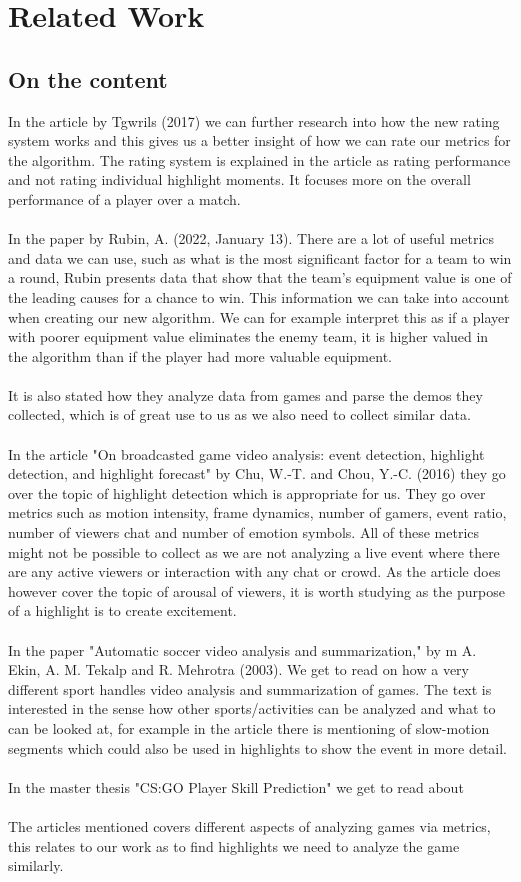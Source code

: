 \chapter{Related Work}
\label{chp:relatedwork}
\section{On the content}

In the article \cite{Tgwri1s2017} by Tgwrils (2017) we can further research into how the new rating system works and this gives us a better insight of how we can rate our metrics for the algorithm. The rating system is explained in the article as rating performance and not rating individual highlight moments. It focuses more on the overall performance of a player over a match. 
\\\\
In the paper \cite{Rubin2022} by Rubin, A. (2022, January 13). There are a lot of useful metrics and data we can use, such as what is the most significant factor for a team to win a round, Rubin presents data that show that the team's equipment value is one of the leading causes for a chance to win. This information we can take into account when creating our new algorithm. We can for example interpret this as if a player with poorer equipment value eliminates the enemy team, it is higher valued in the algorithm than if the player had more valuable equipment.\\\\ 
It is also stated how they analyze data from games and parse the demos they collected, which is of great use to us as we also need to collect similar data.\\\\
In the article "On broadcasted game video analysis: event detection, highlight detection, and highlight forecast" by Chu, W.-T. and Chou, Y.-C. (2016) they go over the topic of highlight detection which is appropriate for us. They go over metrics such as motion intensity, frame dynamics, number of gamers, event ratio, number of viewers chat and number of emotion symbols. All of these metrics might not be possible to collect as we are not analyzing a live event where there are any active viewers or interaction with any chat or crowd. As the article does however cover the topic of arousal of viewers, it is worth studying as the purpose of a highlight is to create excitement.\\\\
In the paper  "Automatic soccer video analysis and summarization," by m A. Ekin, A. M. Tekalp and R. Mehrotra (2003). We get to read on how a very different sport handles video analysis and summarization of games. The text is interested in the sense how other sports/activities can be analyzed and what to can be looked at, for example in the article there is mentioning of slow-motion segments which could also be used in highlights to show the event in more detail.
\\\\
In the master thesis "CS:GO Player Skill Prediction" \cite{BaranNama} we get to read about 
\\\\
The articles mentioned covers different aspects of analyzing games via metrics, this relates to our work as to find highlights we need to analyze the game similarly. 